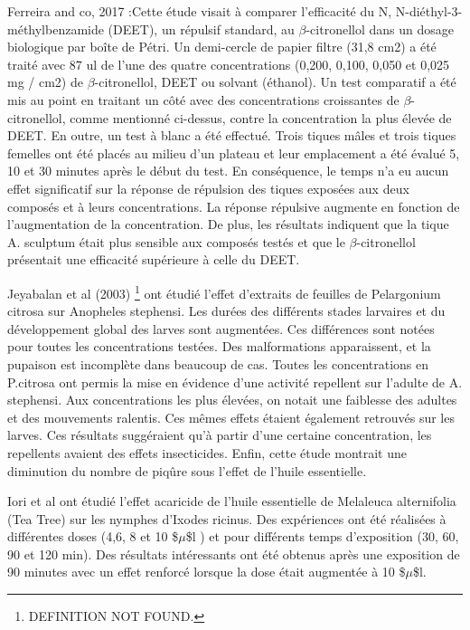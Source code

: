 \documentclass[12pt,a4wide]{article}
\begin{document}
Ferreira  and  co, 2017  :Cette  étude  visait  à  comparer l'efficacité  du  N,
N-diéthyl-3-méthylbenzamide (DEET),  un répulsif standard,  au $\beta$-citronellol
dans un  dosage biologique par boîte  de Pétri. Un demi-cercle  de papier filtre
(31,8 cm2) a  été traité avec 87  ul de l'une des  quatre concentrations (0,200,
0,100,  0,050  et  0,025  mg  /  cm2)  de  $\beta$-citronellol,  DEET  ou  solvant
(éthanol). Un test  comparatif a été mis  au point en traitant un  côté avec des
concentrations  croissantes  de  $\beta$-citronellol, comme  mentionné  ci-dessus,
contre la concentration la plus élevée de DEET.  En outre, un test à blanc a été
effectué. Trois tiques  mâles et trois tiques femelles ont  été placés au milieu
d'un plateau et leur emplacement a été évalué 5, 10 et 30 minutes après le début
du  test.  En  conséquence, le  temps  n’a eu  aucun effet  significatif sur  la
réponse  de  répulsion  des  tiques  exposées  aux  deux  composés  et  à  leurs
concentrations. La réponse  répulsive augmente en fonction  de l'augmentation de
la concentration.  De plus,  les résultats  indiquent que  la tique  A. sculptum
était plus sensible  aux composés testés et que  le $\beta$-citronellol présentait
une efficacité supérieure à celle du DEET.

Jeyabalan  et al  (2003)  \footnote{DEFINITION NOT FOUND.}  ont étudié  l'effet  d'extraits  de feuilles  de
Pelargonium citrosa  sur Anopheles stephensi.  Les durées des  différents stades
larvaires et du développement global des larves sont augmentées. Ces différences
sont  notées   pour  toutes   les  concentrations  testées.   Des  malformations
apparaissent, et  la pupaison est incomplète  dans beaucoup de cas.   Toutes les
concentrations  en P.citrosa  ont  permis  la mise  en  évidence d'une  activité
repellent sur l'adulte de A. stephensi.  Aux concentrations les plus élevées, on
notait une  faiblesse des adultes et  des mouvements ralentis. Ces  mêmes effets
étaient  également retrouvés  sur  les larves.  Ces  résultats suggéraient  qu'à
partir  d'une   certaine  concentration,  les  repellents   avaient  des  effets
insecticides.  Enfin,  cette étude montrait  une diminution du nombre  de piqûre
sous l'effet de l'huile essentielle.


Iori et al  \cite{Iori2005} ont étudié l'effet acaricide  de l'huile essentielle
de  Melaleuca alternifolia  (Tea Tree)  sur  les nymphes  d'Ixodes ricinus.  Des
expériences ont  été réalisées à différentes  doses (4,6, 8  et 10 \$$\mu$\$l )  et pour
différents  temps  d'exposition   (30,  60,  90  et  120   min).  Des  résultats
intéressants ont  été obtenus après une  exposition de 90 minutes  avec un effet
renforcé lorsque la dose était augmentée à 10 \$$\mu$\$l.
\end{document}
